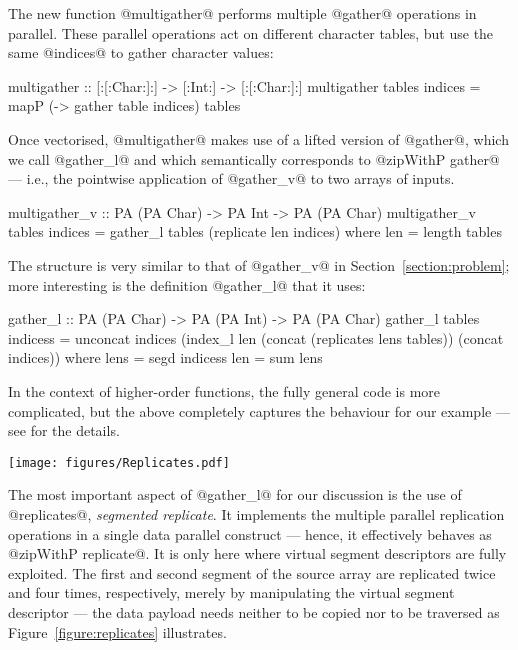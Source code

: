 The new function @multigather@ performs multiple @gather@ operations in parallel. These parallel operations act on different character tables, but use the same @indices@ to gather character values:
%
\begin{code}
  multigather :: [:[:Char:]:] -> [:Int:] 
              -> [:[:Char:]:]
  multigather tables indices
   = mapP (\table -> gather table indices) tables
\end{code}
%
Once vectorised, @multigather@ makes use of a lifted version of @gather@, which we call @gather_l@ and which semantically corresponds to @zipWithP gather@ --- i.e., the pointwise application of @gather_v@ to two arrays of inputs.
%
\begin{code}
  multigather_v :: PA (PA Char) -> PA Int 
                -> PA (PA Char)
  multigather_v tables indices
   = gather_l tables (replicate len indices)
   where len = length tables
\end{code}
%
The structure is very similar to that of @gather_v@ in Section~\ref{section:problem}; more interesting is the definition @gather_l@ that it uses:
%
\begin{code}
  gather_l :: PA (PA Char) -> PA (PA Int) 
           -> PA (PA Char)
  gather_l tables indicess
   = unconcat indices 
       (index_l len (concat (replicates lens tables)) 
                    (concat indices))
   where lens = segd indicess
         len  = sum lens
\end{code}
%
 In the context of higher-order functions, the fully general code is more complicated, but the above completely captures the behaviour for our example --- see \cite{PeytonJones:harnessing-the-multicores} for the details.

\begin{figure*}
\begin{center}
\centering\texttt{[image: figures/Replicates.pdf]}
\caption{Segmented replicate using virtual segments}
\end{center}
\label{figure:replicates}
\end{figure*}
%
The most important aspect of @gather_l@ for our discussion is the use of @replicates@, \emph{segmented replicate}.  It implements the multiple parallel replication operations in a single data parallel construct --- hence, it effectively behaves as @zipWithP replicate@.  It is only here where virtual segment descriptors are fully exploited.  The first and second segment of the source array are replicated twice and four times, respectively, merely by manipulating the virtual segment descriptor --- the data payload needs neither to be copied nor to be traversed as Figure~\ref{figure:replicates} illustrates.

